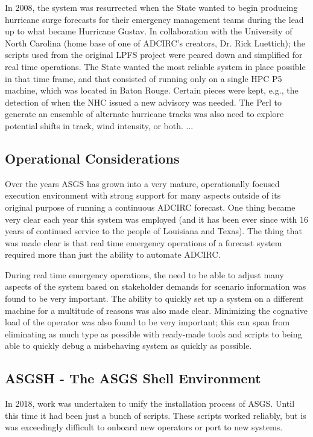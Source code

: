 \documentclass{article}
\begin{document}
In 2008, the system was resurrected when the State wanted to begin producing
hurricane surge forecasts for their emergency management teams during the lead
up to what became Hurricane Gustav. In collaboration with the University of
North Carolina (home base of one of ADCIRC's creators, Dr. Rick Luettich); the
scripts used from the original LPFS project were peared down and simplified for
real time operations. The State wanted the most reliable system in place
possible in that time frame, and that consisted of running only on a single HPC
P5 machine, which was located in Baton Rouge. Certain pieces were kept, e.g.,
the detection of when the NHC issued a new advisory was needed. The Perl to
generate an ensemble of alternate hurricane tracks was also need to explore
potential shifts in track, wind intensity, or both. ...

\subsection{Operational Considerations}

Over the years ASGS has grown into a very mature, operationally focused
execution environment with strong support for many aspects outside of its
original purpose of running a continuous ADCIRC forecast. One thing became very
clear each year this system was employed (and it has been ever since with 16
years of continued service to the people of Louisiana and Texas). The thing that
was made clear is that real time emergency operations of a forecast system
required more than just the ability to automate ADCIRC.

During real time emergency operations, the need to be able to adjust many
aspects of the system based on stakeholder demands for scenario information was
found to be very important. The ability to quickly set up a system on a
different machine for a multitude of reasons was also made clear. Minimizing the
cognative load of the operator was also found to be very important; this can
span from eliminating as much type as possible with ready-made tools and scripts
to being able to quickly debug a misbehaving system as quickly as possible.
\subsection{ASGSH - The ASGS Shell Environment}

In 2018, work was undertaken to unify the installation process of ASGS. Until
this time it had been just a bunch of scripts. These scripts worked reliably,
but is was exceedingly difficult to onboard new operators or port to new
systems.
\end{document}
